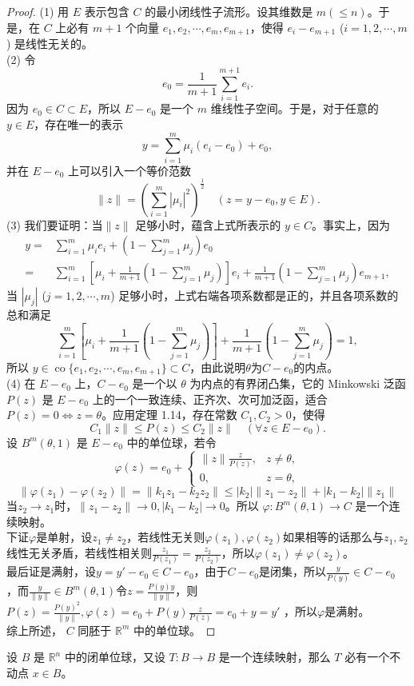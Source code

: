 \documentclass[lang=cn,newtx,10pt,scheme=chinese,thmcnt=chapter]{elegantbook}
\begin{document}
\begin{proof}
(1) 用 $E$ 表示包含 $C$ 的最小闭线性子流形。设其维数是 $m(\leqslant n)$。于是，在 $C$ 上必有 $m+1$ 个向量 $e_1, e_2, \cdots, e_m, e_{m+1}$，使得 $e_i - e_{m+1}$ ($i = 1, 2, \cdots, m$) 是线性无关的。\\
(2) 令
\[
e_0 = \frac{1}{m+1} \sum_{i=1}^{m+1} e_i.
\]
因为 $e_0 \in C \subset E$，所以 $E - e_0$ 是一个 $m$ 维线性子空间。于是，对于任意的 $y \in E$，存在唯一的表示
\[
y = \sum_{i=1}^m \mu_i (e_i - e_0) + e_0,
\]
并在 $E - e_0$ 上可以引入一个等价范数
\[
\|z\| = \left(\sum_{i=1}^m |\mu_i|^2\right)^{\frac{1}{2}} \quad (z = y - e_0, y \in E).
\]
(3) 我们要证明：当$\|z\|$ 足够小时，蕴含上式所表示的 $y \in C$。事实上，因为
\[
\begin{aligned}
y = & \sum_{i=1}^m \mu_i e_i + \left(1 - \sum_{j=1}^m \mu_j \right) e_0 \\
= & \sum_{i=1}^m \left[\mu_i + \frac{1}{m+1}\left(1 - \sum_{j=1}^m \mu_j\right)\right] e_i  + \frac{1}{m+1}\left(1 - \sum_{j=1}^m \mu_j\right) e_{m+1},
\end{aligned}
\]
当 $\left|\mu_j\right|$ ($j=1,2,\cdots,m$) 足够小时，上式右端各项系数都是正的，并且各项系数的总和满足
\[
\sum_{i=1}^m \left[\mu_i + \frac{1}{m+1}\left(1 - \sum_{j=1}^m \mu_j\right)\right] + \frac{1}{m+1} \left(1 - \sum_{j=1}^m \mu_j\right) = 1,
\]
所以 $y \in \operatorname{co} \{e_1, e_2, \cdots, e_m, e_{m+1}\} \subset C$，由此说明$\theta$为$C-e_0$的内点。\\
(4) 在 $E - e_0$ 上，$C - e_0$ 是一个以 $\theta$ 为内点的有界闭凸集，它的 Minkowski 泛函 $P(z)$ 是 $E - e_0$ 上的一个一致连续、正齐次、次可加泛函，适合 $P(z) = 0 \Longleftrightarrow z = \theta$。应用定理 1.14，存在常数 $C_1, C_2 > 0$，使得
\[
C_1 \|z\| \leqslant P(z) \leqslant C_2 \|z\| \quad (\forall z \in E - e_0).
\]
设 $B^m(\theta, 1)$ 是 $E - e_0$ 中的单位球，若令
\[
\varphi(z) = e_0 + 
\begin{cases}
\|z\| \frac{z}{P(z)}, & z \neq \theta, \\
0, & z = \theta,
\end{cases}
\]
\[
\|\varphi(z_1)-\varphi(z_2)\|=\|k_1z_1-k_2z_2\|\leqslant |k_2|\|z_1-z_2\|+|k_1-k_2|\|z_1\|
\]
当$z_2\to z_1$时，$\|z_1-z_2\|\to 0,|k_1-k_2|\to 0$。所以 $\varphi: B^m(\theta, 1) \rightarrow C$ 是一个连续映射。\\
下证$\varphi$是单射，设$z_1\neq z_2$，若线性无关则$\varphi(z_1),\varphi(z_2)$如果相等的话那么与$z_1,z_2$线性无关矛盾，若线性相关则$\frac{z_1}{P(z_1)}=\frac{z_2}{P(z_2)}$，所以$\varphi(z_1)\neq \varphi(z_2)$。\\
最后证是满射，设$y=y'-e_0\in C-e_0$，由于$C-e_0$是闭集，所以$\frac{y}{P(y)}\in C-e_0$
，而$\frac{y}{\|y\|}\in B^m(\theta,1)$令$z=\frac{P(y)y}{\|y\|}$，则$P(z)=\frac{P(y)^2}{\|y\|},\varphi(z)=e_0+{P(y)}\frac{z}{P(z)}=e_0+y=y'
$
，所以$\varphi$是满射。\\
综上所述， $C$ 同胚于 $\mathbb{R}^m$ 中的单位球。



\end{proof}
\begin{theorem}[Brouwer]
设 $B$ 是 $\mathbb{R}^n$ 中的闭单位球，又设 $T: B \rightarrow B$ 是一个连续映射，那么 $T$ 必有一个不动点 $x \in B$。
\end{theorem}
\end{document}
